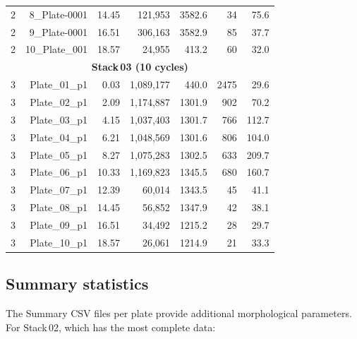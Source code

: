 \documentclass[12pt,a4paper]{article}
\begin{document}
\begin{table}[H]
\begin{tabular}{crrrrrr}
2 & 8\_Plate-0001 & 14.45 & 121,953 & 3582.6 & 34 & 75.6 \\
2 & 9\_Plate-0001 & 16.51 & 306,163 & 3582.9 & 85 & 37.7 \\
2 & 10\_Plate\_001 & 18.57 & 24,955 & 413.2 & 60 & 32.0 \\
\midrule
\multicolumn{7}{c}{\textbf{Stack\,03 (10 cycles)}} \\
\rule{0pt}{2ex}
3 & Plate\_01\_p1 & 0.03 & 1,089,177 & 440.0 & 2475 & 29.6 \\
3 & Plate\_02\_p1 & 2.09 & 1,174,887 & 1301.9 & 902 & 70.2 \\
3 & Plate\_03\_p1 & 4.15 & 1,037,403 & 1301.7 & 766 & 112.7 \\
3 & Plate\_04\_p1 & 6.21 & 1,048,569 & 1301.6 & 806 & 104.0 \\
3 & Plate\_05\_p1 & 8.27 & 1,075,283 & 1302.5 & 633 & 209.7 \\
3 & Plate\_06\_p1 & 10.33 & 1,169,823 & 1345.5 & 680 & 160.7 \\
3 & Plate\_07\_p1 & 12.39 & 60,014 & 1343.5 & 45 & 41.1 \\
3 & Plate\_08\_p1 & 14.45 & 56,852 & 1347.9 & 42 & 38.1 \\
3 & Plate\_09\_p1 & 16.51 & 34,492 & 1215.2 & 28 & 29.7 \\
3 & Plate\_10\_p1 & 18.57 & 26,061 & 1214.9 & 21 & 33.3 \\
\bottomrule
\end{tabular}
\end{table}

\subsection{Summary statistics}

The Summary CSV files per plate provide additional morphological
parameters. For Stack\,02, which has the most complete data:
\end{document}
